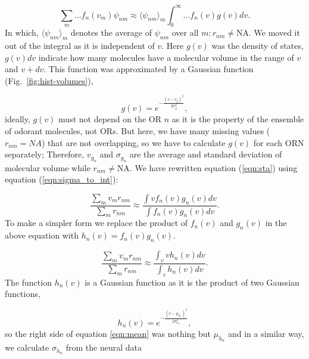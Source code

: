 \documentclass[11pt]{paper} %
\begin{document}
\begin{equation}
	\sum_{m} \dots f_n(v_m) \psi_{nm} \approx  \langle \psi_{nm} \rangle_m \int_0^\infty \dots f_n(v) g(v)  dv. 
	\label{eqn:sigma_to_int}
\end{equation}
In which, 
$\langle \psi_{nm} \rangle_m$ denotes the average of $\psi_{nm}$ over all $m: r_{nm} \neq \text{NA}$. 
We moved it out of the integral as it is independent of $v$.
Here $g(v)$ was the density of states, $g(v) dv$ indicate how many molecules have a molecular volume in the range of $v$ and $v+dv$.
This function was approximated by a Gaussian function (Fig.~\ref{fig:hist-volumes}), 

\begin{equation}
	g(v) = e^{-\frac{(v- v_{g})^2}{2 \sigma_{g}^2}},
	\label{eqn:hist-volumes}
\end{equation}
ideally, $g(v)$ must not depend on the OR $n$ as it is the property of the ensemble of odorant molecules, not ORs. 
But here, we have many missing values ($r_{nm} = NA$) that are not overlapping, 
so we have to calculate $g(v)$ for each ORN separately; 
Therefore, $v_{g_n}$ and $\sigma_{g_n}$ are the average and standard deviation of molecular volume while $r_{nm} \neq \text{NA}$.
We have rewritten equation (\ref{eqn:sta}) using equation (\ref{eqn:sigma_to_int}):

\begin{equation}
	\frac{\displaystyle \sum_{m} v_m r_{nm}}{\displaystyle \sum_{m} r_{nm}} \approx \frac{\displaystyle \int v f_n(v) g_n(v) dv}{\displaystyle \int f_n(v) g_n(v) dv}.
	\label{eqn:sta_int}
\end{equation}
To make a simpler form we replace the product of $f_n(v)$ and $g_n(v)$ in the above equation with $h_n(v) = f_n(v) g_n(v)$.

\begin{equation}
	\frac{\displaystyle \sum_{m} v_m r_{nm}}{\displaystyle \sum_{m} r_{nm}} \approx \frac{\displaystyle \int_v v h_n(v) dv}{ \displaystyle \int_v  h_n(v) dv }.
	\label{eqn:mean}
\end{equation}
The function $h_n(v)$ is a Gaussian function as it is the product of two Gaussian functions, 

\begin{equation}
h_n(v) = e^{-\frac{(v-\mu_{h_n})^2}{2\sigma_{h_n}^2}}, 
\end{equation}
so the right side of equation \ref{eqn:mean} was nothing but $\mu_{h_n}$ and 
in a similar way, we calculate $\sigma_{h_n}$ from the neural data
\end{document}
